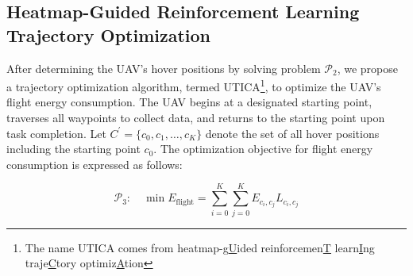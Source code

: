 \documentclass[sigconf]{acmart}
\begin{document}
\subsection{Heatmap-Guided Reinforcement Learning Trajectory Optimization}
% 
After determining the UAV's hover positions by solving problem $\mathcal{P}_2$, we propose a trajectory optimization algorithm, termed UTICA\footnote{The name UTICA comes from heatmap-g\underline{U}ided reinforcemen\underline{T} learn\underline{I}ng traje\underline{C}tory optimiz\underline{A}tion}, to optimize the UAV's flight energy consumption. The UAV begins at a designated starting point, traverses all waypoints to collect data, and returns to the starting point upon task completion. Let $C^{\prime} = \{c_0, c_1, \ldots, c_K\}$ denote the set of all hover positions including the starting point $c_0$. The optimization objective for flight energy consumption is expressed as follows:

\begin{equation}
    \mathcal{P}_3:\quad \min E_{\mathrm{flight}}=\sum_{i=0}^K\sum_{j=0}^K E_{c_i,c_j} L_{c_i,c_j} \tag{17}
\end{equation}
\end{document}
